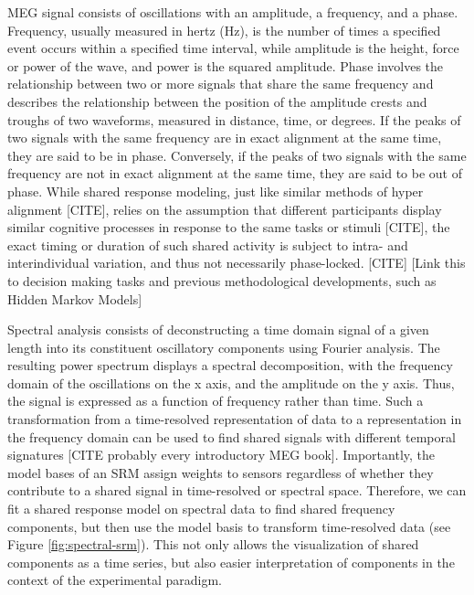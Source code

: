MEG signal consists of oscillations with an amplitude, a frequency, and a phase.
Frequency, usually measured in hertz (Hz), is the number of times a specified event occurs within a specified time interval, while amplitude is the height, force or power of the wave, and power is the squared amplitude.
Phase involves the relationship between two or more signals that share the same frequency and describes the relationship between the position of the amplitude crests and troughs of two waveforms, measured in distance, time, or degrees.
If the peaks of two signals with the same frequency are in exact alignment at the same time, they are said to be in phase.
Conversely, if the peaks of two signals with the same frequency are not in exact alignment at the same time, they are said to be out of phase.
While shared response modeling, just like similar methods of hyper alignment [CITE], relies on the assumption that different participants display similar cognitive processes in response to the same tasks or stimuli [CITE], the exact timing or duration of such shared activity is subject to intra- and interindividual variation, and thus not necessarily phase-locked. [CITE]
[Link this to decision making tasks and previous methodological developments, such as Hidden Markov Models]

Spectral analysis consists of deconstructing a time domain signal of a given length into its constituent oscillatory components using Fourier analysis.
The resulting power spectrum displays a spectral decomposition, with the frequency domain of the oscillations on the x axis, and the amplitude on the y axis.
Thus, the signal is expressed as a function of frequency rather than time.
Such a transformation from a time-resolved representation of data to a representation in the frequency domain can be used to find shared signals with different temporal signatures [CITE probably every introductory MEG book].
Importantly, the model bases of an \gls{SRM} assign weights to sensors regardless of whether they contribute to a shared signal in time-resolved or spectral space.
Therefore, we can fit a shared response model on spectral data to find shared frequency components, but then use the model basis to transform time-resolved data (see Figure \ref{fig:spectral-srm}).
This not only allows the visualization of shared components as a time series, but also easier interpretation of components in the context of the experimental paradigm.


